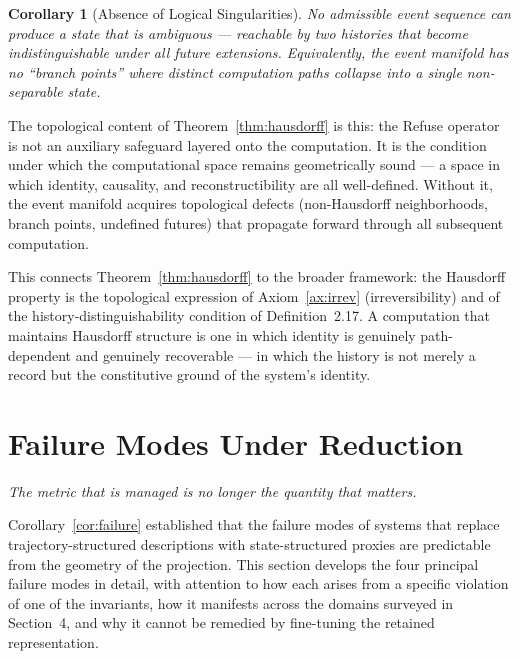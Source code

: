 \documentclass[12pt, twoside]{article}
\theoremstyle{plain}
\newtheorem{corollary}[theorem]{Corollary}
\theoremstyle{definition}
\theoremstyle{remark}
\begin{document}
\begin{corollary}[Absence of Logical Singularities]
No admissible event sequence can produce a state that is ambiguous
— reachable by two histories that become indistinguishable under
all future extensions.
Equivalently, the event manifold has no ``branch points''
where distinct computation paths collapse into a single
non-separable state.
\end{corollary}

The topological content of Theorem~\ref{thm:hausdorff} is this:
the Refuse operator is not an auxiliary safeguard layered
onto the computation.
It is the condition under which the computational space remains
geometrically sound — a space in which identity, causality,
and reconstructibility are all well-defined.
Without it, the event manifold acquires topological defects
(non-Hausdorff neighborhoods, branch points, undefined futures)
that propagate forward through all subsequent computation.

This connects Theorem~\ref{thm:hausdorff} to the broader
framework: the Hausdorff property is the topological expression
of Axiom~\ref{ax:irrev} (irreversibility) and of the
history-distinguishability condition of Definition~2.17.
A computation that maintains Hausdorff structure is one in which
identity is genuinely path-dependent and genuinely recoverable —
in which the history is not merely a record but the constitutive
ground of the system's identity.

\newpage

\section{Failure Modes Under Reduction}

\epigraph{\itshape
  The metric that is managed is no longer the quantity that matters.}{}

Corollary~\ref{cor:failure} established that the failure modes of
systems that replace trajectory-structured descriptions with
state-structured proxies are predictable from the geometry
of the projection.
This section develops the four principal failure modes in detail,
with attention to how each arises from a specific violation of
one of the invariants, how it manifests across the domains
surveyed in Section~4, and why it cannot be remedied by
fine-tuning the retained representation.

\end{document}
